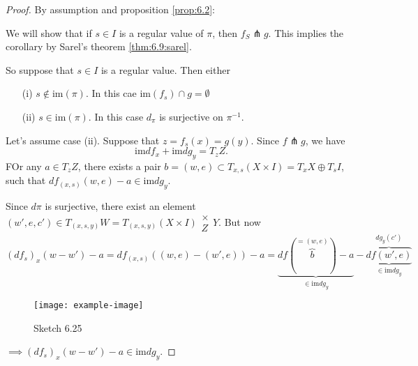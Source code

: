 \begin{proof}
    By assumption and proposition \ref{prop:6.2}: 
    \begin{center}
    \end{center}
    We will show that if \(s\in I\) is a regular value of \(\pi\), then \(f_S\pitchfork g\). This implies the corollary
    by Sarel's theorem \ref{thm:6.9:sarel}.
    
    So suppose that \(s\in I \) is a regular value. Then either 
    \begin{enumerate}
        \item[(i)] \(s\notin\text{im}(\pi)\). In this cae \(\text{im}(f_s)\cap g=\emptyset\)
        \item[(ii)] \(s\in\text{im}(\pi)\). In this case \(d_\pi\)  is surjective on \(\pi^{-1}\). 
    \end{enumerate}
    Let's assume case (ii). Suppose that \(z=f_s(x)=g(y)\). Since  \(f\pitchfork g\), we have 
    \[\text{im}df_x+\text{im}dg_y=T_zZ.\]
    FOr any \(a\in T_zZ\), there exists a pair \(b=(w,e)\subset T_{x,s}(X\times I)=T_xX\oplus T_sI\),
    such that \(df_{(x,s)}(w,e)-a\in \text{im}dg_y.\) 

    Since \(d\pi\) is surjective, there exist an element \((w',e,c')\in T_{(x,s,y)}W=T_{(x,s,y)}(X\times I)\substack{\times\\Z}Y\).
    But now \[(df_s)_x(w-w')-a=df_{(x,s)}((w,e)-(w',e))-a=\underbrace{df(\overbrace{b}^{=(w,e)})-a}_{\in \text{im}dg_y}-\underbrace{\overbrace{df(w',e)}^{dg_y(c')}}_{\in \text{im}dg_y}\]
    \begin{figure}[H]\label{fig:6.25}
        \centering
        \texttt{[image: example-image]}
        \caption{Sketch 6.25}
    \end{figure}
    \(\implies (df_s)_x(w-w')-a\in \text{im}dg_y\).

\end{proof}

